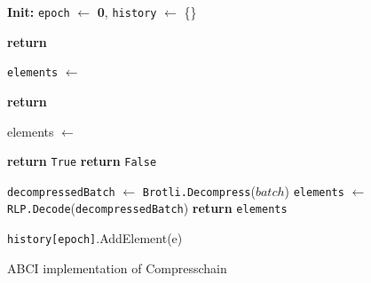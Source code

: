 \begin{figure}[t!]
  \begin{adjustbox}{minipage=[t]{\columnwidth}}
    \begin{algorithm}[H]
      \renewcommand{\thealgorithm}{Compresschain ABCI}         
      \caption{\small ABCI implementation of Compresschain}%
      \label{alg:abci-brotli}%
      \small
      \begin{algorithmic}[1]
            \State \textbf{Init:} \texttt{epoch} $\leftarrow$ \textbf{0}, \texttt{history} $\leftarrow$ \{\}

            \label{alg:brotli_check_tx}
                \State \textbf{return} 
            \EndFunction
      
            \label{alg:brotli_deliver_tx}
				\State \texttt{elements} $\leftarrow$ 
				\State {}
            		
            		\State \textbf{return}
            \EndFunction
            
            \label{alg:brotli_is_valid}
            		\State elements $\leftarrow$ 
            		
                    		\State \textbf{return} \texttt{True}
                    \EndIf
                \EndFor
                \State \textbf{return} \texttt{False}
            \EndFunction
            
            \label{alg:brotli_get_element}
                \State \texttt{decompressedBatch} $\leftarrow$ \texttt{Brotli.Decompress}($batch$)
                \State \texttt{elements} $\leftarrow$ \texttt{RLP.Decode}(\texttt{decompressedBatch})
                \State \textbf{return} \texttt{elements}
            \EndFunction
            
            \label{alg:brotli_new_epoch}
                				\State \texttt{history[epoch]}.AddElement(e)
                    	 \EndIf
                	\EndFor
                	

\end{algorithmic}
\end{algorithm}
\end{adjustbox}
\end{figure}
